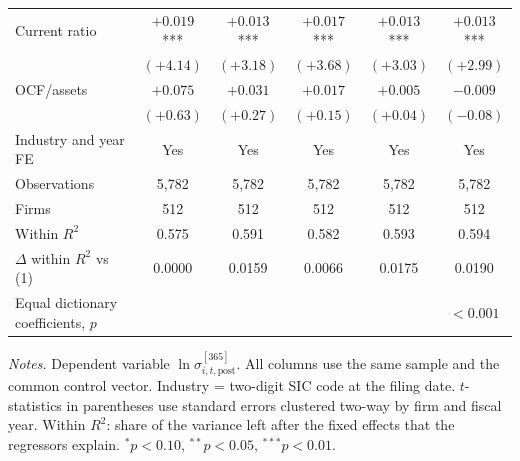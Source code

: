 \begin{table}[htbp]
\begin{tabular}{lccccc}
Current ratio & $+0.019$*** & $+0.013$*** & $+0.017$*** & $+0.013$*** & $+0.013$*** \\
 & $(+4.14)$ & $(+3.18)$ & $(+3.68)$ & $(+3.03)$ & $(+2.99)$ \\[2pt]
OCF/assets & $+0.075$ & $+0.031$ & $+0.017$ & $+0.005$ & $-0.009$ \\
 & $(+0.63)$ & $(+0.27)$ & $(+0.15)$ & $(+0.04)$ & $(-0.08)$ \\[2pt]
\midrule
Industry and year FE & Yes & Yes & Yes & Yes & Yes \\
Observations & 5,782 & 5,782 & 5,782 & 5,782 & 5,782 \\
Firms & 512 & 512 & 512 & 512 & 512 \\
Within $R^2$ & 0.575 & 0.591 & 0.582 & 0.593 & 0.594 \\
$\Delta$ within $R^2$ vs (1) & 0.0000 & 0.0159 & 0.0066 & 0.0175 & 0.0190 \\
Equal dictionary coefficients, $p$ & & & & & $<0.001$ \\
\bottomrule
\end{tabular}
\par\smallskip
\begin{minipage}{\linewidth}\footnotesize
\emph{Notes.} Dependent variable $\ln\sigma^{[365]}_{i,t,\mathrm{post}}$. All columns use the same sample and the common control vector. Industry = two-digit SIC code at the filing date. $t$-statistics in parentheses use standard errors clustered two-way by firm and fiscal year. Within $R^2$: share of the variance left after the fixed effects that the regressors explain. $^{*}p<0.10$, $^{**}p<0.05$, $^{***}p<0.01$.
\end{minipage}
\end{table}
